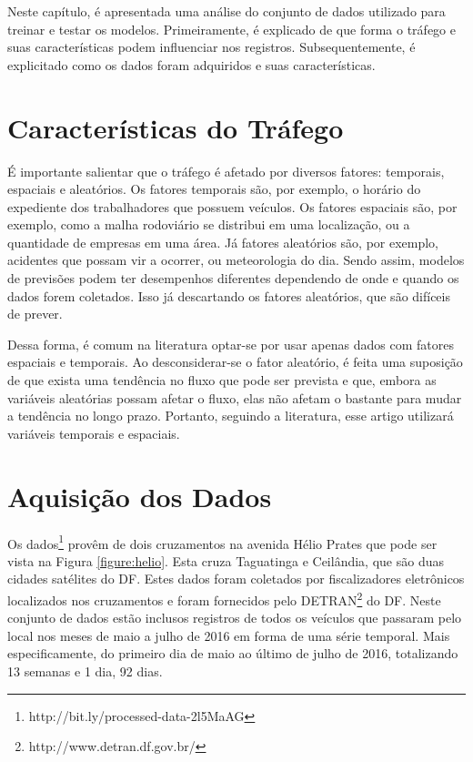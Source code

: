 
Neste capítulo, é apresentada uma análise do conjunto de dados utilizado para treinar e testar os modelos. Primeiramente, é explicado de que forma o tráfego e suas características podem influenciar nos registros. Subsequentemente, é explicitado como os dados foram adquiridos e suas características.

\section{Características do Tráfego}

É importante salientar que o tráfego é afetado por diversos fatores: temporais, espaciais e aleatórios. Os fatores temporais são, por exemplo, o horário do expediente dos trabalhadores que possuem veículos. Os fatores espaciais são, por exemplo, como a malha rodoviário se distribui em uma localização, ou a quantidade de empresas em uma área. Já fatores aleatórios são, por exemplo, acidentes que possam vir a ocorrer, ou meteorologia do dia. Sendo assim, modelos de previsões podem ter desempenhos diferentes dependendo de onde e quando os dados forem coletados. Isso já descartando os fatores aleatórios, que são difíceis de prever.

Dessa forma, é comum na literatura optar-se por usar apenas dados com fatores espaciais e temporais. Ao desconsiderar-se o fator aleatório, é feita uma suposição de que exista uma tendência no fluxo que pode ser prevista e que, embora as variáveis aleatórias possam afetar o fluxo, elas não afetam o bastante para mudar a tendência no longo prazo. Portanto, seguindo a literatura, esse artigo utilizará variáveis temporais e espaciais.

\section{Aquisição dos Dados}

Os dados\footnote{http://bit.ly/processed-data-2l5MaAG} provêm de dois cruzamentos na avenida Hélio Prates que pode ser vista na Figura \ref{figure:helio}. Esta cruza Taguatinga e Ceilândia, que são duas cidades satélites do \acrfull{DF}. Estes dados foram coletados por fiscalizadores eletrônicos localizados nos cruzamentos e foram fornecidos pelo \acrfull{DETRAN}\footnote{http://www.detran.df.gov.br/} do \acrshort{DF}. Neste conjunto de dados estão inclusos registros de todos os veículos que passaram pelo local nos meses de maio a julho de 2016 em forma de uma série temporal. Mais especificamente, do primeiro dia de maio ao último de julho de 2016, totalizando 13 semanas e 1 dia, 92 dias. 

